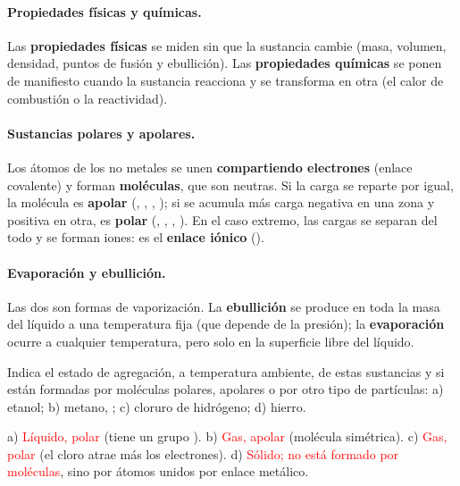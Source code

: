 \paragraph{Propiedades físicas y químicas.} Las \textbf{propiedades físicas} se miden sin que la sustancia cambie (masa,
volumen, densidad, puntos de fusión y ebullición). Las \textbf{propiedades químicas} se ponen de manifiesto cuando la sustancia
reacciona y se transforma en otra (el calor de combustión o la reactividad).

\paragraph{Sustancias polares y apolares.} Los átomos de los no metales se unen \textbf{compartiendo electrones} (enlace
covalente) y forman \textbf{moléculas}, que son neutras. Si la carga se reparte por igual, la molécula es \textbf{apolar}
(, , , ); si se acumula más carga negativa en una zona y positiva en otra, es \textbf{polar}
(, , , ). En el caso extremo, las cargas se separan del todo y se forman iones: es el
\textbf{enlace iónico} ().

\paragraph{Evaporación y ebullición.} Las dos son formas de vaporización. La \textbf{ebullición} se produce en toda la masa del
líquido a una temperatura fija (que depende de la presión); la \textbf{evaporación} ocurre a cualquier temperatura, pero solo en
la superficie libre del líquido.

\begin{exercise}
    Indica el estado de agregación, a temperatura ambiente, de estas sustancias y si están formadas por moléculas polares,
    apolares o por otro tipo de partículas: a) etanol; b) metano, ; c) cloruro de hidrógeno; d) hierro.
    \begin{solu}
        a) \textcolor{red}{Líquido, polar} (tiene un grupo ). b) \textcolor{red}{Gas, apolar} (molécula simétrica).
        c) \textcolor{red}{Gas, polar} (el cloro atrae más los electrones). d) \textcolor{red}{Sólido; no está formado por moléculas},
        sino por átomos unidos por enlace metálico.
    \end{solu}
\end{exercise}

